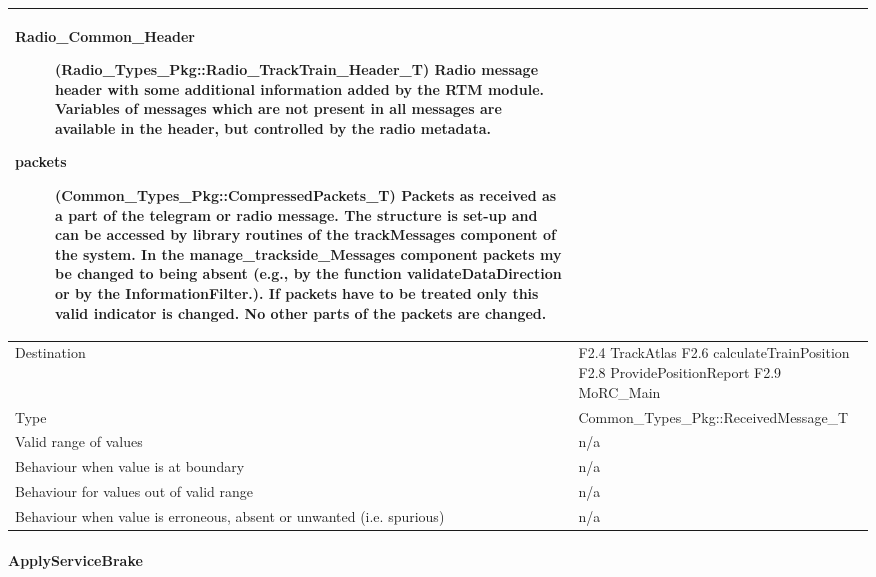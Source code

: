 \begin{longtable}{p{}p{}}
\begin{description}
\item[Radio\_Common\_Header](Radio\_Types\_Pkg::\newline Radio\_TrackTrain\_Header\_T) Radio message header with some additional information added by the RTM module. Variables of messages which are not present in all messages are available in the header, but controlled by the radio metadata.
\item[packets](Common\_Types\_Pkg::CompressedPackets\_T) Packets as received as a part of the telegram or radio message. The structure is set-up and can be accessed by library routines of the trackMessages component of the system. In the manage\_trackside\_Messages component packets my be changed to being absent (e.g., by the function validateDataDirection or by the InformationFilter.). If packets have to be treated only this valid indicator is changed. No other parts of the packets are changed.
\end{description}
\\
\midrule
Destination				& F2.4 TrackAtlas\newline
F2.6 calculateTrainPosition\newline
F2.8 ProvidePositionReport\newline
F2.9 MoRC\_Main
\\ 
\midrule
Type					& Common\_Types\_Pkg::ReceivedMessage\_T \\
\midrule
Valid range of values	& n/a\\
\midrule
Behaviour when value is at boundary	& n/a\\
\midrule
Behaviour for values out of valid range	& n/a\\
\midrule
Behaviour when value is erroneous, absent or unwanted (i.e. spurious) & n/a\\
\bottomrule
\end{longtable}


\paragraph{ApplyServiceBrake}

